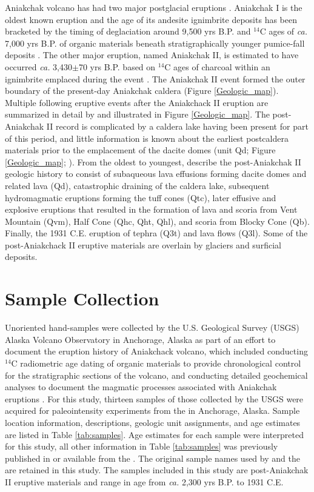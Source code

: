 \documentclass[draft]{agujournal2019}
\begin{document}
Aniakchak volcano has had two major postglacial eruptions \cite{Miller1987a}. Aniakchak I is the oldest known eruption and the age of its andesite ignimbrite deposits has been bracketed by the timing of deglaciation around 9,500 yrs B.P. and $^{14}$C ages of \textit{ca.} 7,000 yrs B.P. of organic materials beneath stratigraphically younger pumice-fall deposits \cite{Vanderhoek2009a}. The other major eruption, named Aniakchak II, is estimated to have occurred \textit{ca.} 3,430$\pm$70 yrs B.P. based on $^{14}$C ages of charcoal within an ignimbrite emplaced during the event \cite{Miller1987a, Bacon2014a}. The Aniakchak II event formed the outer boundary of the present-day Aniakchak caldera (Figure \ref{Geologic_map}). Multiple following eruptive events after the Aniakchack II eruption are summarized in detail by  and illustrated in Figure \ref{Geologic_map}. The post-Aniakchak II record is complicated by a caldera lake having been present for part of this period, and little information is known about the earliest postcaldera materials prior to the emplacement of the dacite domes (unit Qd; Figure \ref{Geologic_map}; ). From the oldest to youngest,  describe the post-Aniakchak II geologic history to consist of subaqueous lava effusions forming dacite domes and related lava (Qd), catastrophic draining of the caldera lake, subsequent hydromagmatic eruptions forming the tuff cones (Qtc), later effusive and explosive eruptions that resulted in the formation of lava and scoria from Vent Mountain (Qvm), Half Cone (Qhc, Qht, Qhl), and scoria from Blocky Cone (Qb). Finally, the 1931 C.E. eruption of tephra (Q3t) and lava flows (Q3l). Some of the post-Aniakchack II eruptive materials are overlain by glaciers and surficial deposits.

\section{Sample Collection}
Unoriented hand-samples were collected by the U.S. Geological Survey (USGS) Alaska Volcano Observatory in Anchorage, Alaska as part of an effort to document the eruption history of Aniakchack volcano, which included conducting $^{14}$C radiometric age dating of organic materials to provide chronological control for the stratigraphic sections of the volcano, and conducting detailed geochemical analyses to document the magmatic processes associated with Aniakchak eruptions \cite{Bacon2014a}. For this study, thirteen samples of those collected by the USGS were acquired for paleointensity experiments from the  in Anchorage, Alaska.  Sample location information, descriptions, geologic unit assignments, and age estimates are listed in Table \ref{tab:samples}. Age estimates for each sample were interpreted for this study, all other information in Table \ref{tab:samples} was previously  published in  or available from the . The original sample names used by  and the  are retained in this study. The samples included in this study are post-Aniakchak II eruptive materials and range in age from \textit{ca.} 2,300 yrs B.P. to 1931 C.E.
\end{document}
